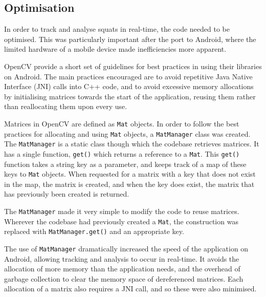 \subsection{Optimisation}

In order to track and analyse squats in real-time, the code needed to be optimised. This was particularly important after the port to Android, where the limited hardware of a mobile device made inefficiencies more apparent.

OpenCV provide a short set of guidelines for best practices in using their libraries on Android\cite{opencvoptim}. The main practices encouraged are to avoid repetitive Java Native Interface (JNI) calls into C++ code, and to avoid excessive memory allocations by initialising matrices towards the start of the application, reusing them rather than reallocating them upon every use.

Matrices in OpenCV are defined as \verb!Mat! objects. In order to follow the best practices for allocating and using \verb!Mat! objects, a \verb!MatManager! class was created. The \verb!MatManager! is a static class though which the codebase retrieves matrices. It has a single function, \verb!get()! which returns a reference to a \verb!Mat!. This \verb!get()! function takes a string key as a parameter, and keeps track of a map of these keys to \verb!Mat! objects. When requested for a matrix with a key that does not exist in the map, the matrix is created, and when the key does exist, the matrix that has previously been created is returned.

The \verb!MatManager! made it very simple to modify the code to reuse matrices. Wherever the codebase had previously created a \verb!Mat!, the construction was replaced with \verb!MatManager.get()! and an appropriate key.

The use of \verb!MatManager! dramatically increased the speed of the application on Android, allowing tracking and analysis to occur in real-time. It avoids the allocation of more memory than the application needs, and the overhead of garbage collection to clear the memory space of dereferenced matrices. Each allocation of a matrix also requires a JNI call, and so these were also minimised.